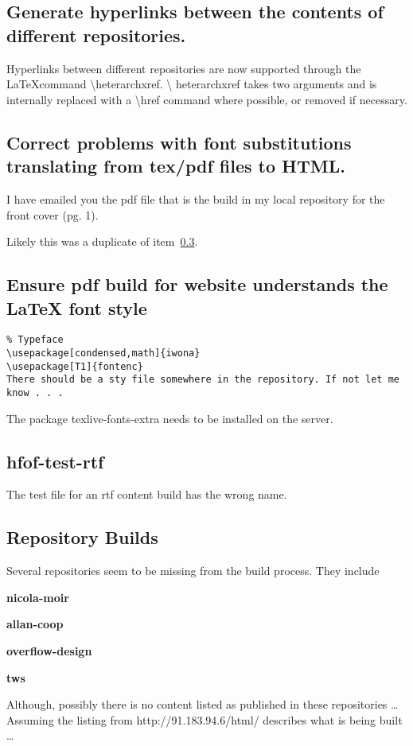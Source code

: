 \documentclass[12pt]{article}
\begin{document}
\subsection{Generate hyperlinks between the contents of different repositories.}
\label{sec:gener-hyperl-betw}
Hyperlinks between different repositories are now supported through
the \LaTeX command \textbackslash heterarchxref.  \textbackslash
heterarchxref takes two arguments and is internally replaced with a
\textbackslash href command where possible, or removed if necessary.


\subsection{Correct problems with font substitutions translating from tex/pdf files to HTML.}
\label{sec:corr-probl-with}
I have emailed you the pdf file that is the build in my local repository for the front cover (pg. 1). 

Likely this was a duplicate of item~\ref{sec:ensure-pdf-build}.


\subsection{Ensure pdf build for website understands the LaTeX font style}
\label{sec:ensure-pdf-build}
\begin{verbatim}
% Typeface
\usepackage[condensed,math]{iwona}
\usepackage[T1]{fontenc}
There should be a sty file somewhere in the repository. If not let me know . . .
\end{verbatim}

The package texlive-fonts-extra needs to be installed on the server.


\subsection{hfof-test-rtf}

The test file for an rtf content build has the wrong name.


\subsection{Repository Builds}

Several repositories seem to be missing from the build process. They include
\begin{description} 
\item {\bf nicola-moir}
\item {\bf allan-coop}
\item {\bf overflow-design}
\item{\bf  tws}
\end{description}
Although, possibly there is no content listed as published in these repositories \ldots\\
Assuming the listing from http://91.183.94.6/html/ describes what is being built \ldots
\end{document}
